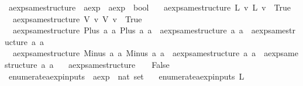 \begin{isabellebody}
%
\isadelimproof
\isanewline
%
\endisadelimproof
\isanewline
{}\isamarkupfalse%
\ aexp{\isacharunderscore}same{\isacharunderscore}structure\ {\isacharcolon}{\isacharcolon}\ {\isachardoublequoteopen}aexp\ {\isasymRightarrow}\ aexp\ {\isasymRightarrow}\ bool{\isachardoublequoteclose}\ \isanewline
\ \ {\isachardoublequoteopen}aexp{\isacharunderscore}same{\isacharunderscore}structure\ {\isacharparenleft}L\ v{\isacharparenright}\ {\isacharparenleft}L\ v{\isacharprime}{\isacharparenright}\ {\isacharequal}\ True{\isachardoublequoteclose}\ {\isacharbar}\isanewline
\ \ {\isachardoublequoteopen}aexp{\isacharunderscore}same{\isacharunderscore}structure\ {\isacharparenleft}V\ v{\isacharparenright}\ {\isacharparenleft}V\ v{\isacharprime}{\isacharparenright}\ {\isacharequal}\ True{\isachardoublequoteclose}\ {\isacharbar}\isanewline
\ \ {\isachardoublequoteopen}aexp{\isacharunderscore}same{\isacharunderscore}structure\ {\isacharparenleft}Plus\ a{}\ a{}{\isacharparenright}\ {\isacharparenleft}Plus\ a{}{\isacharprime}\ a{}{\isacharprime}{\isacharparenright}\ {\isacharequal}\ {\isacharparenleft}aexp{\isacharunderscore}same{\isacharunderscore}structure\ a{}\ a{}{\isacharprime}\ {\isasymand}\ aexp{\isacharunderscore}same{\isacharunderscore}structure\ a{}\ a{}{\isacharprime}{\isacharparenright}{\isachardoublequoteclose}\ {\isacharbar}\isanewline
\ \ {\isachardoublequoteopen}aexp{\isacharunderscore}same{\isacharunderscore}structure\ {\isacharparenleft}Minus\ a{}\ a{}{\isacharparenright}\ {\isacharparenleft}Minus\ a{}{\isacharprime}\ a{}{\isacharprime}{\isacharparenright}\ {\isacharequal}\ {\isacharparenleft}aexp{\isacharunderscore}same{\isacharunderscore}structure\ a{}\ a{}{\isacharprime}\ {\isasymand}\ aexp{\isacharunderscore}same{\isacharunderscore}structure\ a{}\ a{}{\isacharprime}{\isacharparenright}{\isachardoublequoteclose}\ {\isacharbar}\isanewline
\ \ {\isachardoublequoteopen}aexp{\isacharunderscore}same{\isacharunderscore}structure\ {\isacharunderscore}\ {\isacharunderscore}\ {\isacharequal}\ False{\isachardoublequoteclose}\isanewline
\isanewline
{}\isamarkupfalse%
\ enumerate{\isacharunderscore}aexp{\isacharunderscore}inputs\ {\isacharcolon}{\isacharcolon}\ {\isachardoublequoteopen}aexp\ {\isasymRightarrow}\ nat\ set{\isachardoublequoteclose}\ \isanewline
\ \ {\isachardoublequoteopen}enumerate{\isacharunderscore}aexp{\isacharunderscore}inputs\ {\isacharparenleft}L\ {\isacharunderscore}{\isacharparenright}\ {\isacharequal}\ {\isacharbraceleft}{\isacharbraceright}{\isachardoublequoteclose}\ {\isacharbar}\isanewline

\end{isabellebody}
